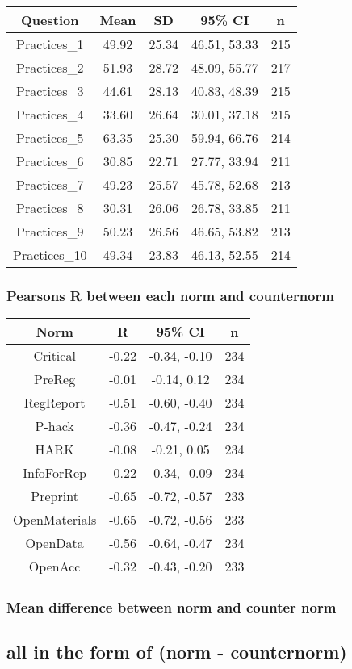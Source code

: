 \documentclass[
]{article}
\begin{document}
\begin{longtable}[]{@{}ccccc@{}}
\toprule
Question & Mean & SD & 95\% CI & n\tabularnewline
\midrule
\endhead
Practices\_1 & 49.92 & 25.34 & 46.51, 53.33 & 215\tabularnewline
Practices\_2 & 51.93 & 28.72 & 48.09, 55.77 & 217\tabularnewline
Practices\_3 & 44.61 & 28.13 & 40.83, 48.39 & 215\tabularnewline
Practices\_4 & 33.60 & 26.64 & 30.01, 37.18 & 215\tabularnewline
Practices\_5 & 63.35 & 25.30 & 59.94, 66.76 & 214\tabularnewline
Practices\_6 & 30.85 & 22.71 & 27.77, 33.94 & 211\tabularnewline
Practices\_7 & 49.23 & 25.57 & 45.78, 52.68 & 213\tabularnewline
Practices\_8 & 30.31 & 26.06 & 26.78, 33.85 & 211\tabularnewline
Practices\_9 & 50.23 & 26.56 & 46.65, 53.82 & 213\tabularnewline
Practices\_10 & 49.34 & 23.83 & 46.13, 52.55 & 214\tabularnewline
\bottomrule
\end{longtable}

\hypertarget{pearsons-r-between-each-norm-and-counternorm}{%
\subsubsection{Pearsons R between each norm and
counternorm}\label{pearsons-r-between-each-norm-and-counternorm}}

\begin{longtable}[]{@{}cccc@{}}
\toprule
Norm & R & 95\% CI & n\tabularnewline
\midrule
\endhead
Critical & -0.22 & -0.34, -0.10 & 234\tabularnewline
PreReg & -0.01 & -0.14, 0.12 & 234\tabularnewline
RegReport & -0.51 & -0.60, -0.40 & 234\tabularnewline
P-hack & -0.36 & -0.47, -0.24 & 234\tabularnewline
HARK & -0.08 & -0.21, 0.05 & 234\tabularnewline
InfoForRep & -0.22 & -0.34, -0.09 & 234\tabularnewline
Preprint & -0.65 & -0.72, -0.57 & 233\tabularnewline
OpenMaterials & -0.65 & -0.72, -0.56 & 233\tabularnewline
OpenData & -0.56 & -0.64, -0.47 & 234\tabularnewline
OpenAcc & -0.32 & -0.43, -0.20 & 233\tabularnewline
\bottomrule
\end{longtable}

\hypertarget{mean-difference-between-norm-and-counter-norm}{%
\subsubsection{Mean difference between norm and counter
norm}\label{mean-difference-between-norm-and-counter-norm}}

\hypertarget{all-in-the-form-of-norm---counternorm}{%
\subsection{all in the form of (norm -
counternorm)}\label{all-in-the-form-of-norm---counternorm}}
\end{document}
